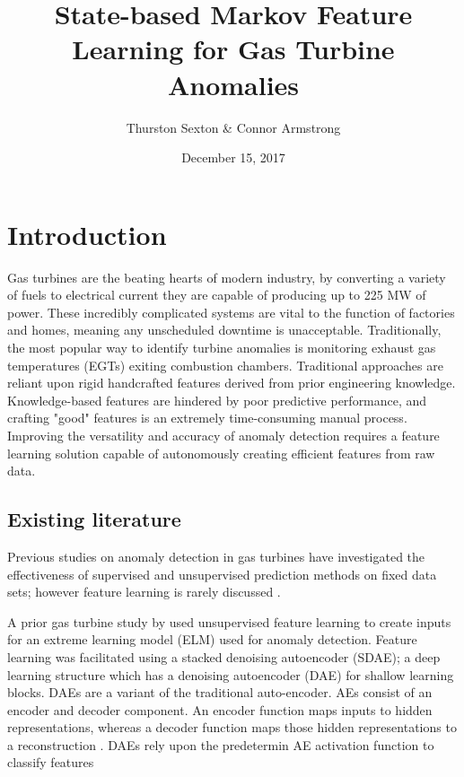 \documentclass[twocolumn,10pt]{article}
\title{State-based Markov Feature Learning for Gas Turbine Anomalies}
\author{Thurston Sexton \& Connor Armstrong}
\date{December 15, 2017}
\begin{document}
\maketitle

\section{Introduction}

Gas turbines are the beating hearts of modern industry, by converting a variety of fuels to electrical current they are capable of producing up to 225 MW of power. These incredibly complicated systems are vital to the function of factories and homes, meaning any unscheduled downtime is unacceptable. Traditionally, the most popular way to identify turbine anomalies is monitoring exhaust gas temperatures (EGTs) exiting combustion chambers. Traditional approaches are reliant upon rigid handcrafted features derived from prior engineering knowledge. Knowledge-based features are hindered by poor predictive performance, and crafting "good" features is an extremely time-consuming manual process. Improving the versatility and accuracy of anomaly detection requires a feature learning solution capable of autonomously creating efficient features from raw data. 


\subsection{Existing literature}

Previous studies on anomaly detection in gas turbines have investigated the effectiveness of supervised and unsupervised prediction methods on fixed data sets; however feature learning is rarely discussed \cite{yan2015}. 

A prior gas turbine study by \citet{yan2015} used unsupervised feature learning to create inputs for an extreme learning model (ELM) used for anomaly detection. Feature learning was facilitated using a stacked denoising autoencoder (SDAE); a deep learning structure which has a denoising autoencoder (DAE) for shallow learning blocks. DAEs are a variant of the traditional auto-encoder. AEs consist of an encoder and decoder component. An encoder function maps inputs to hidden representations, whereas a decoder function maps those hidden representations to a reconstruction \cite{yan2015}. DAEs rely upon the predetermin AE activation function to classify features
\end{document}
